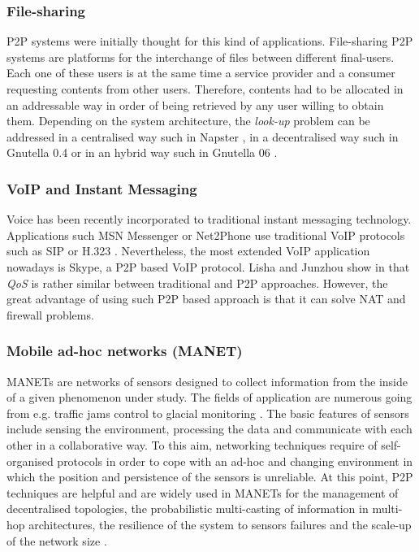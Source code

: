 \subsubsection{File-sharing}

    P2P systems were initially thought for this kind of applications. File-sharing P2P systems are platforms for the interchange of files between different final-users. Each one of these users is at the same time a service provider and a consumer requesting contents from other users. Therefore, contents had to be allocated in an addressable way in order of being retrieved by any user willing to obtain them. Depending on the system architecture, the \emph{look-up} problem can be addressed in a centralised way such in Napster \cite{napstervsgnutella}, in a decentralised way such in Gnutella 0.4 \cite{gnutella04} or in an hybrid way such in Gnutella 06 \cite{gnutella06}.

\subsubsection{VoIP and Instant Messaging}

    Voice has been recently incorporated to traditional instant messaging technology. Applications such MSN Messenger or Net2Phone use traditional VoIP protocols such as SIP or H.323 \cite{sip,h323}. Nevertheless, the most extended VoIP application nowadays is Skype, a P2P based VoIP protocol. Lisha and Junzhou show in \cite{voipp2p} that \emph{QoS} is rather similar between traditional and P2P approaches. However, the great advantage of using such P2P based approach is that it can solve NAT and firewall problems.


\subsubsection{Mobile ad-hoc networks (MANET)}

    MANETs are networks of sensors designed to collect information from the inside of a given phenomenon under study. The fields of application are numerous going from e.g. traffic jams control to glacial monitoring \cite{manetapplications}. The basic features of sensors include sensing the environment, processing the data and communicate with each other in a collaborative way. To this aim, networking techniques require of self-organised protocols in order to cope with an ad-hoc and changing environment in which the position and persistence of the sensors is unreliable. At this point, P2P techniques are helpful and are widely used in MANETs for the management of decentralised topologies, the probabilistic multi-casting of  information in multi-hop architectures, the resilience of the system to sensors failures and the scale-up of the network size \cite{manetp2p}.


